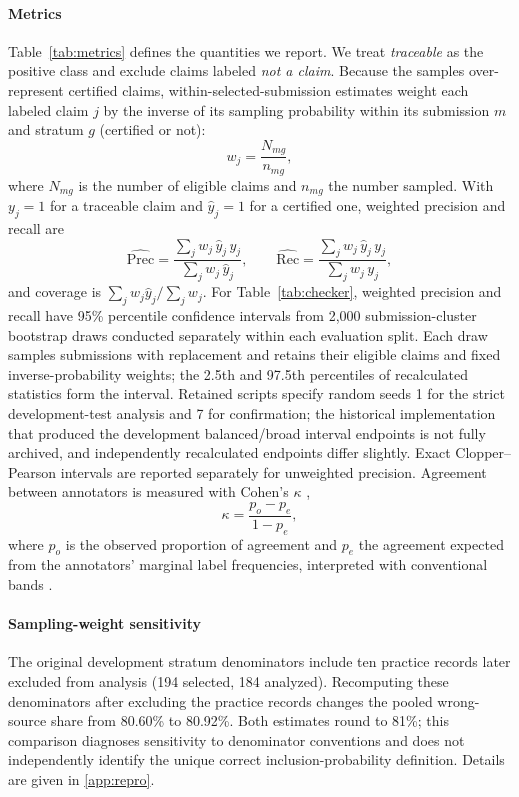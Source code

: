 \documentclass[preprint,12pt,authoryear]{elsarticle}
\begin{document}
\paragraph{Metrics} Table~\ref{tab:metrics} defines the quantities we report. We treat \emph{traceable} as the positive class and exclude claims labeled \emph{not a claim}. Because the samples over-represent certified claims, within-selected-submission estimates weight each labeled claim $j$ by the inverse of its sampling probability within its submission $m$ and stratum $g$ (certified or not):
\begin{equation}
w_j = \frac{N_{mg}}{n_{mg}},
\label{eq:weights}
\end{equation}
where $N_{mg}$ is the number of eligible claims and $n_{mg}$ the number sampled. With $y_j=1$ for a traceable claim and $\hat y_j=1$ for a certified one, weighted precision and recall are
\begin{equation}
\widehat{\mathrm{Prec}} = \frac{\sum_j w_j\,\hat y_j\,y_j}{\sum_j w_j\,\hat y_j}, \qquad
\widehat{\mathrm{Rec}} = \frac{\sum_j w_j\,\hat y_j\,y_j}{\sum_j w_j\,y_j},
\label{eq:precrec}
\end{equation}
and coverage is $\sum_j w_j\hat y_j/\sum_j w_j$. For Table~\ref{tab:checker}, weighted precision and recall have 95\% percentile confidence intervals from 2,000 submission-cluster bootstrap draws conducted separately within each evaluation split. Each draw samples submissions with replacement and retains their eligible claims and fixed inverse-probability weights; the 2.5th and 97.5th percentiles of recalculated statistics form the interval. Retained scripts specify random seeds 1 for the strict development-test analysis and 7 for confirmation; the historical implementation that produced the development balanced/broad interval endpoints is not fully archived, and independently recalculated endpoints differ slightly. Exact Clopper--Pearson intervals are reported separately for unweighted precision. Agreement between annotators is measured with Cohen's $\kappa$ \citep{cohen1960kappa},
\begin{equation}
\kappa = \frac{p_o - p_e}{1-p_e},
\label{eq:kappa}
\end{equation}
where $p_o$ is the observed proportion of agreement and $p_e$ the agreement expected from the annotators' marginal label frequencies, interpreted with conventional bands \citep{landis1977kappa}.

\paragraph{Sampling-weight sensitivity} The original development stratum denominators include ten practice records later excluded from analysis (194 selected, 184 analyzed). Recomputing these denominators after excluding the practice records changes the pooled wrong-source share from 80.60\% to 80.92\%. Both estimates round to 81\%; this comparison diagnoses sensitivity to denominator conventions and does not independently identify the unique correct inclusion-probability definition. Details are given in \ref{app:repro}.
\end{document}
